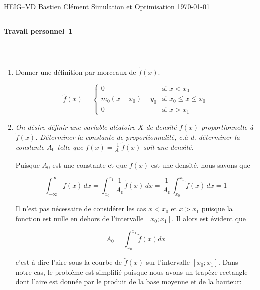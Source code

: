 \documentclass[a4paper,11pt]{report}
\newcounter{numero}
\newcommand{\exo}{{\Large \vspace*{2mm}\addtocounter{numero}{1}{\bf Problème~\thenumero}\\[2mm]}}
\begin{document}
	
{\sc HEIG--VD} \hfill Bastien Clément\newline 
Simulation et Optimisation \hfill \today \newline
\hrule
\vspace{7mm}
 \hfill {\large \bf Travail personnel~1}\\[3mm]
\hrule
\vspace{7mm}

\exo
\begin{enumerate}[\indent a)]\itemsep3mm
	
\item Donner une définition par morceaux de $\tilde{f}(x)$.

\begin{equation*}
\tilde{f}(x) = \left\lbrace \begin{array}{ll}
	0						& \text{si $x < x_0$} \\
	m_0 ( x - x_0 ) + y_0	& \text{si $x_0 \leq x \leq x_0$} \\
	0 						& \text{si $x > x_1$}
\end{array} \right.
\end{equation*}

\item {\em On désire définir une variable aléatoire $X$ de densité $f(x)$ proportionnelle à $\tilde{f}(x)$. Déterminer la constante de proportionnalité, c.à-d. déterminer la constante $A_{0}$ telle que $f(x) = \frac{1}{A_{0}}\tilde{f}(x)$ soit une densité.}

Puisque $A_{0}$ est une constante et que $f(x)$ est une densité, nous savons que

\begin{equation*}
	\int_{-\infty}^{\infty} f(x)\,dx =
	\int_{x_0}^{x_1} \frac{1}{A_0} \tilde{f}(x)\,dx =
	\frac{1}{A_0} \int_{x_0}^{x_1} \tilde{f}(x)\,dx = 1
\end{equation*}

Il n'est pas nécessaire de considérer les cas $x < x_0$ et $x > x_1$ puisque la fonction est nulle en dehors de l'intervalle $[x_0; x_1]$. Il alors est évident que

\begin{equation*}
	A_0 = \int_{x_0}^{x_1} \tilde{f}(x)dx
\end{equation*}

c'est à dire l'aire sous la courbe de $\tilde{f}(x)$ sur l'intervalle $[x_0; x_1]$. Dans notre cas, le problème est simplifié puisque nous avons un trapèze rectangle dont l'aire est donnée par le produit de la base moyenne et de la hauteur:


\end{enumerate}
\end{document}
